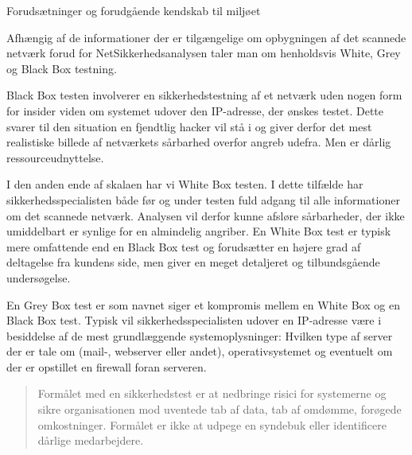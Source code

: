 \documentclass[20pt,landscape,a4paper,footrule]{foils}
\begin{document}


\begin{list1}
\item Forudsætninger og forudgående kendskab til miljøet
\item
Afhængig af de informationer der er tilgængelige om opbygningen af det
scannede netværk forud for NetSikkerhedsanalysen taler man om
henholdsvis White, Grey og Black Box testning.
\begin{list2}
\item Black Box testen involverer en sikkerhedstestning af et netværk uden
nogen form for insider viden om systemet udover den IP-adresse, der
ønskes testet. Dette svarer til den situation en fjendtlig hacker vil
stå i og giver derfor det mest realistiske billede af netværkets
sårbarhed overfor angreb udefra. Men er dårlig ressourceudnyttelse.

\item I den anden ende  af skalaen har vi White Box testen. I dette tilfælde
har sikkerhedsspecialisten både før og under testen fuld adgang til
alle informationer om det scannede netværk. Analysen vil derfor kunne
afsløre sårbarheder, der ikke umiddelbart er synlige for en almindelig
angriber. En White Box test er typisk mere omfattende end en Black Box
test og forudsætter en højere grad af deltagelse fra kundens side, men
giver en meget detaljeret og tilbundsgående undersøgelse.

\item En Grey Box test er som navnet siger et kompromis mellem en White Box
og en Black Box test. Typisk vil sikkerhedsspecialisten udover en
IP-adresse være i besiddelse af de mest grundlæggende
systemoplysninger: Hvilken type af server der er tale om (mail-,
webserver eller andet), operativsystemet og eventuelt om der er
opstillet en firewall foran serveren.
\end{list2}
\end{list1}



\begin{quote}
Formålet med en sikkerhedstest er at nedbringe risici for systemerne
og sikre organisationen mod uventede tab af data, tab af omdømme,
forøgede omkostninger. Formålet er ikke at udpege en syndebuk eller
identificere dårlige medarbejdere.
\end{quote}
\end{document}
